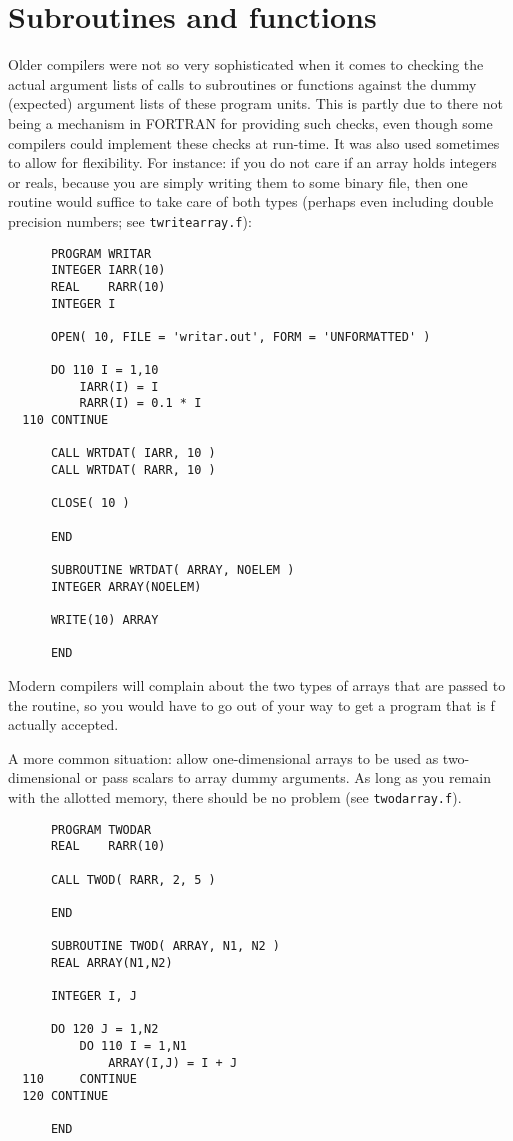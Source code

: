 \section{Subroutines and functions}
Older compilers were not so very sophisticated when it comes to checking the
actual argument lists of calls to subroutines or functions against the
dummy (expected) argument lists of these program units. This is partly due
to there not being a mechanism in FORTRAN for providing such checks, even though
some compilers could implement these checks at run-time. It was also used sometimes
to allow for flexibility. For instance: if you do not care if an array holds integers
or reals, because you are simply writing them to some binary file, then one
routine would suffice to take care of both types (perhaps even including double
precision numbers; see \verb+twritearray.f+):

\begin{verbatim}
      PROGRAM WRITAR
      INTEGER IARR(10)
      REAL    RARR(10)
      INTEGER I

      OPEN( 10, FILE = 'writar.out', FORM = 'UNFORMATTED' )

      DO 110 I = 1,10
          IARR(I) = I
          RARR(I) = 0.1 * I
  110 CONTINUE

      CALL WRTDAT( IARR, 10 )
      CALL WRTDAT( RARR, 10 )

      CLOSE( 10 )

      END

      SUBROUTINE WRTDAT( ARRAY, NOELEM )
      INTEGER ARRAY(NOELEM)

      WRITE(10) ARRAY

      END
\end{verbatim}

Modern compilers will complain about the two types of arrays that are passed to
the routine, so you would have to go out of your way to get a program that is                                  f
actually accepted.

A more common situation: allow one-dimensional arrays to be used as two-dimensional
or pass scalars to array dummy arguments. As long as you remain with the allotted
memory, there should be no problem (see \verb+twodarray.f+).

\begin{verbatim}
      PROGRAM TWODAR
      REAL    RARR(10)

      CALL TWOD( RARR, 2, 5 )

      END

      SUBROUTINE TWOD( ARRAY, N1, N2 )
      REAL ARRAY(N1,N2)

      INTEGER I, J

      DO 120 J = 1,N2
          DO 110 I = 1,N1
              ARRAY(I,J) = I + J
  110     CONTINUE
  120 CONTINUE

      END
\end{verbatim}


